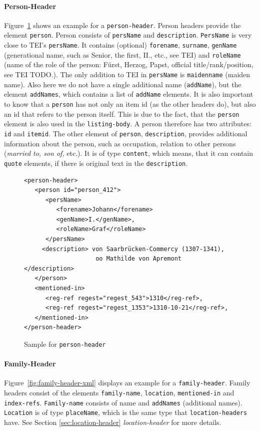 \paragraph{Person-Header}
\label{sec:person-header}
Figure~\ref{fig:person-header-xml} shows an example for a \texttt{person-header}. Person headers provide the element \texttt{person}. Person consists of \texttt{persName} and \texttt{description}. \texttt{PersName} is very close to TEI's \texttt{persName}. It contains (optional) \texttt{forename}, \texttt{surname}, \texttt{genName} (generational name, such as Senior, the first, II., etc., see TEI) and \texttt{roleName} (name of the role of the person: Fürst, Herzog, Papst, official title/rank/position, see TEI TODO.). The only addition to TEI in \texttt{persName} is \texttt{maidenname} (maiden name). Also here we do not have a single additional name (\texttt{addName}), but the element \texttt{addNames}, which contains a list of \texttt{addName} elements. It is also important to know that a \texttt{person} has not only an item id (as the other headers do), but also an id that refers to the person itself. This is due to the fact, that the \texttt{person} element is also used in the \texttt{listing-body}. A person therefore has two attributes: \texttt{id} and \texttt{itemid}.
The other element of \texttt{person}, \texttt{description}, provides additional information about the person, such as occupation, relation to other persons (\textit{married to, son of,} etc.). It is of type \texttt{content}, which means, that it can contain \texttt{quote} elements, if there is original text in the \texttt{description}.

\begin{figure}[H]
\centering
\begin{verbatim}
<person-header>
   <person id="person_412">
      <persName>
         <forename>Johann</forename> 
         <genName>I.</genName>, 
         <roleName>Graf</roleName>
      </persName>
     <description> von Saarbrücken-Commercy (1307-1341), 
                    oo Mathilde von Apremont    </description>
   </person>
   <mentioned-in>
      <reg-ref regest="regest_543">1310</reg-ref>, 
      <reg-ref regest="regest_1353">1310-10-21</reg-ref>, 
   </mentioned-in>
</person-header>
\end{verbatim}
\caption{Sample for \texttt{person-header}}
\label{fig:person-header-xml}
\end{figure}

\paragraph{Family-Header}
Figure~\ref{fig:family-header-xml} displays an example for a \texttt{family-header}. Family headers consist of the elements \texttt{family-name}, \texttt{location}, \texttt{mentioned-in} and \texttt{index-refs}. \texttt{Family-name} consists of name and \texttt{addNames} (additional names). \texttt{Location} is of type \texttt{placeName}, which is the same type that \texttt{location-headers} have. See Section \ref{sec:location-header} \textit{location-header} for more details.

